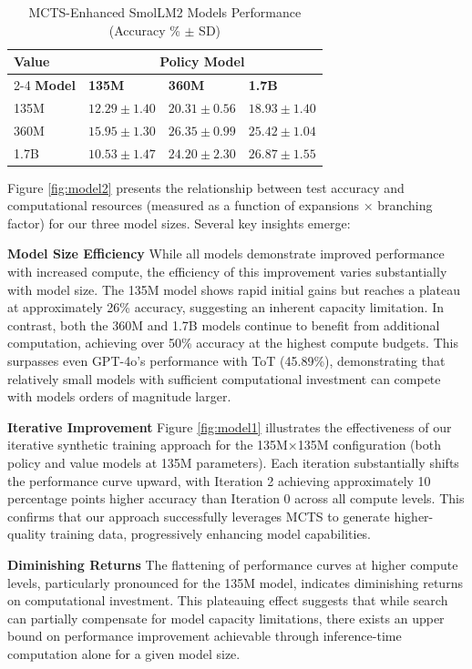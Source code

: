 \documentclass{article}
\begin{document}
\begin{table}[h]
    \centering
    \caption{MCTS-Enhanced SmolLM2 Models Performance (Accuracy \% $\pm$ SD)}
    \label{tab:mcts-results}
    \begin{tabular}{p{2cm}p{3cm}p{3cm}p{3cm}}
        \toprule
        \textbf{Value} & \multicolumn{3}{c}{\textbf{Policy Model}} \\
        \cmidrule(lr){2-4}
        \textbf{Model} & \textbf{135M} & \textbf{360M} & \textbf{1.7B} \\
        \midrule
        135M   & $12.29 \pm 1.40$ & $20.31 \pm 0.56$ & $18.93 \pm 1.40$ \\
        360M   & $15.95 \pm 1.30$ & $26.35 \pm 0.99$ & $25.42 \pm 1.04$ \\
        1.7B   & $10.53 \pm 1.47$ & $24.20 \pm 2.30$ & $26.87 \pm 1.55$ \\
        \bottomrule
    \end{tabular}
\end{table}
Figure \ref{fig:model2} presents the relationship between test accuracy and computational resources (measured as a function of expansions × branching factor) for our three model sizes. Several key insights emerge:

\textbf{Model Size Efficiency} While all models demonstrate improved performance with increased compute, the efficiency of this improvement varies substantially with model size. The 135M model shows rapid initial gains but reaches a plateau at approximately 26\% accuracy, suggesting an inherent capacity limitation. In contrast, both the 360M and 1.7B models continue to benefit from additional computation, achieving over 50\% accuracy at the highest compute budgets. This surpasses even GPT-4o's performance with ToT (45.89\%), demonstrating that relatively small models with sufficient computational investment can compete with models orders of magnitude larger. 

\textbf{Iterative Improvement} Figure \ref{fig:model1} illustrates the effectiveness of our iterative synthetic training approach for the 135M×135M configuration (both policy and value models at 135M parameters). Each iteration substantially shifts the performance curve upward, with Iteration 2 achieving approximately 10 percentage points higher accuracy than Iteration 0 across all compute levels. This confirms that our approach successfully leverages MCTS to generate higher-quality training data, progressively enhancing model capabilities. 

\textbf{Diminishing Returns} The flattening of performance curves at higher compute levels, particularly pronounced for the 135M model, indicates diminishing returns on computational investment. This plateauing effect suggests that while search can partially compensate for model capacity limitations, there exists an upper bound on performance improvement achievable through inference-time computation alone for a given model size. 
\end{document}
